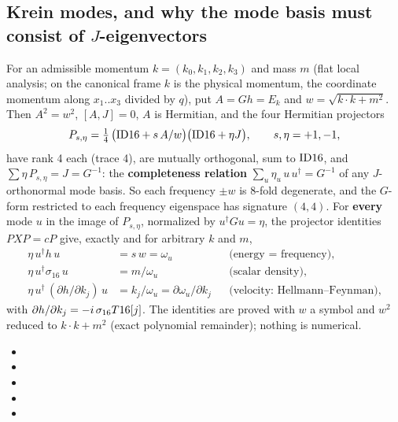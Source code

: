 \subsection{Krein modes, and why the mode basis must consist of \texorpdfstring{$J$}{J}-eigenvectors}
\label{sec:6.13}

For an admissible momentum $k=(k_0,k_1,k_2,k_3)$ and mass $m$ (flat local analysis; on the canonical
frame $k$ is the physical momentum, the coordinate momentum along $x_1..x_3$ divided by $q$), put
$A=Gh=E_k$ and $w=\sqrt{k\cdot k+m^2}$. Then $A^2=w^2$, $[A,J]=0$, $A$ is Hermitian, and the four
Hermitian projectors
\[
  P_{s,\eta}=\tfrac14\,\bigl(\mathrm{ID16}+s\,A/w\bigr)\bigl(\mathrm{ID16}+\eta J\bigr),\qquad s,\eta=+1,-1,
\]
have rank 4 each (trace 4), are mutually orthogonal, sum to $\mathrm{ID16}$, and
$\sum\eta\,P_{s,\eta}=J=G^{-1}$: the \textbf{completeness relation}
$\sum_u\eta_u\,u\,u^{\dagger}=G^{-1}$ of any $J$-orthonormal mode basis. So each frequency $\pm w$ is
8-fold degenerate, and the $G$-form restricted to each frequency eigenspace has signature $(4,4)$.
For \textbf{every} mode $u$ in the image of $P_{s,\eta}$, normalized by $u^{\dagger}Gu=\eta$, the
projector identities $PXP=cP$ give, exactly and for arbitrary $k$ and $m$,
\begin{align*}
  \eta\,u^{\dagger}h\,u&=s\,w=\omega_u &&\text{(energy = frequency)},\\
  \eta\,u^{\dagger}\sigma_{16}\,u&=m/\omega_u &&\text{(scalar density)},\\
  \eta\,u^{\dagger}\,(\partial h/\partial k_j)\,u&=k_j/\omega_u=\partial\omega_u/\partial k_j
    &&\text{(velocity: Hellmann--Feynman)},
\end{align*}
with $\partial h/\partial k_j=-i\,\sigma_{16}T16[j]$.
The identities are proved with $w$ a symbol and $w^2$ reduced to $k\cdot k+m^2$ (exact polynomial
remainder); nothing is numerical. 
\begin{itemize}
  \item {}
  \item {}
  \item {}
  \item {}
  \item {}
\end{itemize}

